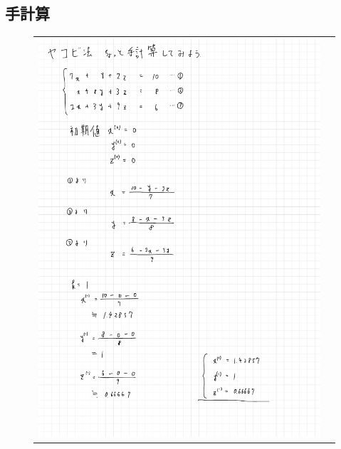 \documentclass[a4paper, titlepage]{jsarticle}
\begin{document}
		\subsection{手計算}
			\begin{figure}[ht]
				\begin{tabular}{cc}
					\begin{minipage}[t]{8.2cm}
						\centering
						\includegraphics[keepaspectratio, scale=0.4]{Jacobi_1.pdf}
					\end{minipage} &
					\begin{minipage}[t]{8.2cm}
						\centering

\end{minipage}
\end{tabular}
\end{figure}
\end{document}
